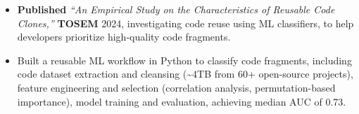 \documentclass[10pt]{resume}
\begin{document}
\vspace{-0.9em}
\begin{itemize} 
\item \textbf{Published} \textit{“An Empirical Study on the Characteristics of Reusable Code Clones,”} \textbf{TOSEM} 2024, investigating code reuse using ML classifiers, to help developers prioritize high-quality code fragments.
\item Built a reusable ML workflow in Python to classify code fragments,  including code dataset extraction and cleansing (\textasciitilde 4TB from 60+ open-source projects), feature engineering and selection (correlation analysis, permutation-based importance), model training and evaluation, %
achieving median AUC of 0.73.


\end{itemize}
\end{document}
